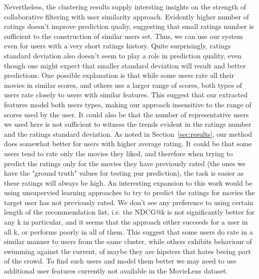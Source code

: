 Nevertheless, the clustering results supply intersting insights on the strength of collaborative filtering with user similarity approach. Evidently higher number of ratings doesn't improve prediction qualiy, suggesting that small ratings number is sufficient to the construction of similar users set. Thus, we can use our system even for users with a very short ratings history. Quite surprisingly, ratings standard deviation also doesn't seem to play a role in prediction quality, even though one might expect that smaller standard deviation will result and better predictions. One possible explanation is that while some users rate all their movies in similar scores, and others use a larger range of scores, both types of users rate closely to users with similar features. This suggest that our extracted features model both users types, making our approach insensitive to the range of scores used by the user. It could also be that the number of representative users we used here is not sufficient to witness the trends evident in the ratings number and the ratings standard deviation.
As noted in Section~\ref{sec:results}, our method does somewhat better for users with higher average rating. It could be that some users tend to rate only the movies they liked, and therefore when trying to predict the ratings only for the movies they have previously rated (the ones we have the "ground truth" values for testing pur prediction), the task is easier as these ratings will always be high. An interesting expansion to this work would be using unsupervied learning approaches to try to predict the ratings for movies the target user has not previously rated. We don't see any preference to using certain length of the recommendation list, i.e. the NDCG@k is not significantly better for any k in particular, and it seems that the approach either succeeds for a user in all k, or performs poorly in all of them. This suggest that some users do rate in a similar manner to users from the same cluster, while others exhibits behaviour of swimming against the current, of maybe they are hipsters that hates beeing part of the crowd. To find such users and model them better we may need to use additional user features currently not available in the MovieLens dataset.

